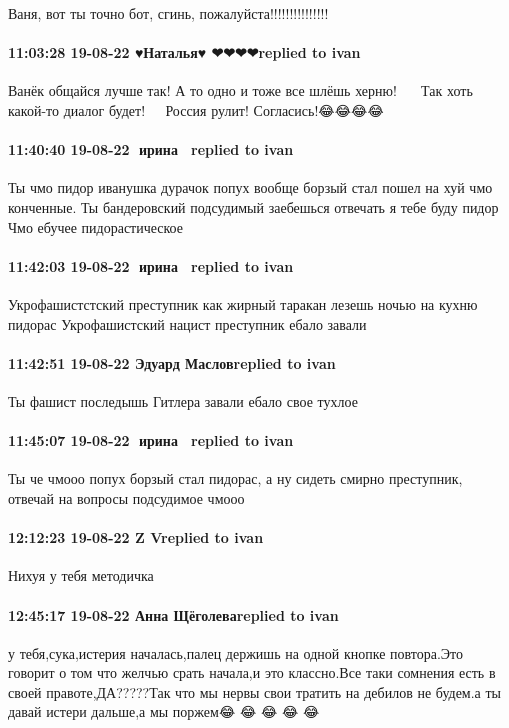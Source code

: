 Ваня, вот ты точно бот, сгинь, пожалуйста!!!!!!!!!!!!!!!

\paragraph{11:03:28 19-08-22 ♥Наталья♥ ❤❤❤❤replied to ivan}

Ванёк общайся лучше так! А то одно и тоже все шлёшь херню! 🤣🤣🤣🤣🤣Так хоть
какой-то диалог будет!🤣🤣🤣🤣
Россия рулит! Согласись!😂😂😂😂

\paragraph{11:40:40 19-08-22 🍏ирина 🍇🍇replied to ivan}

Ты чмо пидор иванушка дурачок попух вообще борзый стал пошел на хуй чмо конченные.
Ты бандеровский подсудимый заебешься отвечать я тебе буду пидор
Чмо ебучее пидорастическое

\paragraph{11:42:03 19-08-22 🍏ирина 🍇🍇replied to ivan}

Укрофашистстский преступник как жирный таракан лезешь ночью на кухню пидорас
Укрофашистский нацист преступник ебало завали

\paragraph{11:42:51 19-08-22 Эдуард Масловreplied to ivan}

Ты фашист последышь Гитлера завали ебало свое тухлое

\paragraph{11:45:07 19-08-22 🍏ирина 🍇🍇replied to ivan}

Ты че чмооо попух борзый стал пидорас, а ну сидеть смирно преступник, отвечай
на вопросы подсудимое чмооо

\paragraph{12:12:23 19-08-22 Z Vreplied to ivan}

Нихуя у тебя методичка 🤣🤣🤣🤣🤣

\paragraph{12:45:17 19-08-22 Анна Щёголеваreplied to ivan}

у тебя,сука,истерия началась,палец держишь на одной кнопке повтора.Это говорит
о том что желчью срать начала,и это классно.Все таки сомнения есть в своей
правоте,ДА?????Так что мы нервы свои тратить на дебилов не будем.а ты давай
истери дальше,а мы поржем😂 😂 😂 😂 😂
